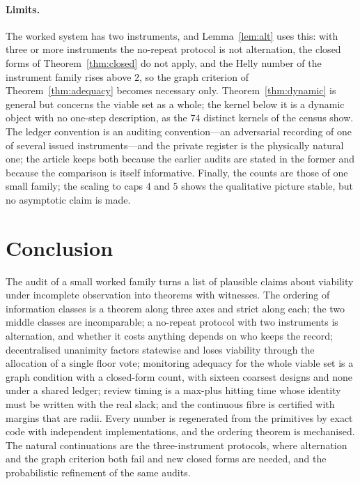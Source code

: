 \documentclass[11pt,a4paper]{article}
\theoremstyle{plain}
\theoremstyle{definition}
\theoremstyle{remark}
\begin{document}
\paragraph{Limits.}
The worked system has two instruments, and Lemma~\ref{lem:alt} uses this: with three or more instruments the no-repeat protocol is not alternation, the closed forms of Theorem~\ref{thm:closed} do not apply, and the Helly number of the instrument family rises above $2$, so the graph criterion of Theorem~\ref{thm:adequacy} becomes necessary only. Theorem~\ref{thm:dynamic} is general but concerns the viable set as a whole; the kernel below it is a dynamic object with no one-step description, as the $74$ distinct kernels of the census show. The ledger convention is an auditing convention---an adversarial recording of one of several issued instruments---and the private register is the physically natural one; the article keeps both because the earlier audits are stated in the former and because the comparison is itself informative. Finally, the counts are those of one small family; the scaling to caps $4$ and $5$ shows the qualitative picture stable, but no asymptotic claim is made.
\section{Conclusion}\label{sec:conclusion}

The audit of a small worked family turns a list of plausible claims about viability under incomplete observation into theorems with witnesses. The ordering of information classes is a theorem along three axes and strict along each; the two middle classes are incomparable; a no-repeat protocol with two instruments is alternation, and whether it costs anything depends on who keeps the record; decentralised unanimity factors statewise and loses viability through the allocation of a single floor vote; monitoring adequacy for the whole viable set is a graph condition with a closed-form count, with sixteen coarsest designs and none under a shared ledger; review timing is a max-plus hitting time whose identity must be written with the real slack; and the continuous fibre is certified with margins that are radii. Every number is regenerated from the primitives by exact code with independent implementations, and the ordering theorem is mechanised. The natural continuations are the three-instrument protocols, where alternation and the graph criterion both fail and new closed forms are needed, and the probabilistic refinement of the same audits.
\end{document}
